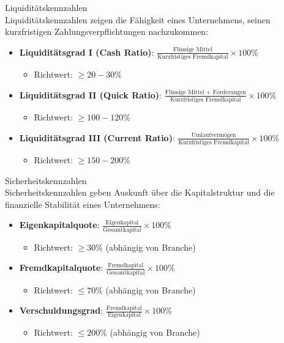 \begin{definition}{Liquiditätskennzahlen}\\
Liquiditätskennzahlen zeigen die Fähigkeit eines Unternehmens, seinen kurzfristigen Zahlungsverpflichtungen nachzukommen:
\begin{itemize}
    \item \textbf{Liquiditätsgrad I (Cash Ratio)}: $\frac{\text{Flüssige Mittel}}{\text{Kurzfristiges Fremdkapital}} \times 100\%$
    \begin{itemize}
        \item Richtwert: $\geq 20-30\%$
    \end{itemize}
    \item \textbf{Liquiditätsgrad II (Quick Ratio)}: $\frac{\text{Flüssige Mittel + Forderungen}}{\text{Kurzfristiges Fremdkapital}} \times 100\%$
    \begin{itemize}
        \item Richtwert: $\geq 100-120\%$
    \end{itemize}
    \item \textbf{Liquiditätsgrad III (Current Ratio)}: $\frac{\text{Umlaufvermögen}}{\text{Kurzfristiges Fremdkapital}} \times 100\%$
    \begin{itemize}
        \item Richtwert: $\geq 150-200\%$
    \end{itemize}
\end{itemize}
\end{definition}

\begin{definition}{Sicherheitskennzahlen}\\
Sicherheitskennzahlen geben Auskunft über die Kapitalstruktur und die finanzielle Stabilität eines Unternehmens:
\begin{itemize}
    \item \textbf{Eigenkapitalquote}: $\frac{\text{Eigenkapital}}{\text{Gesamtkapital}} \times 100\%$
    \begin{itemize}
        \item Richtwert: $\geq 30\%$ (abhängig von Branche)
    \end{itemize}
    \item \textbf{Fremdkapitalquote}: $\frac{\text{Fremdkapital}}{\text{Gesamtkapital}} \times 100\%$
    \begin{itemize}
        \item Richtwert: $\leq 70\%$ (abhängig von Branche)
    \end{itemize}
    \item \textbf{Verschuldungsgrad}: $\frac{\text{Fremdkapital}}{\text{Eigenkapital}} \times 100\%$
    \begin{itemize}
        \item Richtwert: $\leq 200\%$ (abhängig von Branche)
    \end{itemize}
\end{itemize}
\end{definition}

